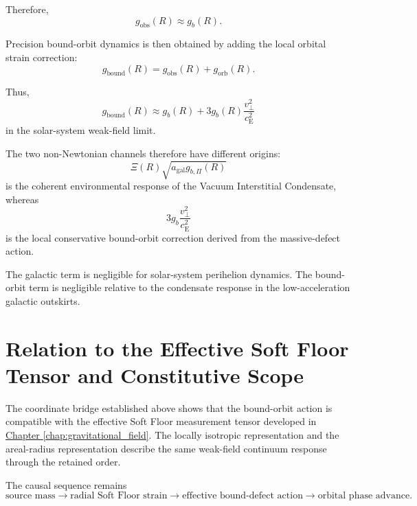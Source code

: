 Therefore,
\begin{equation}
    g_{\mathrm{obs}}(R) \approx g_b(R).
\end{equation}

Precision bound-orbit dynamics is then obtained by adding the local orbital strain correction:
\begin{equation}
    \boxed{ g_{\mathrm{bound}}(R) = g_{\mathrm{obs}}(R) + g_{\mathrm{orb}}(R) }.
\end{equation}

Thus,
\begin{equation}
    g_{\mathrm{bound}}(R) \approx g_b(R) + 3g_b(R) \frac{v_\perp^2}{c_{\mathrm{E}}^2}
\end{equation}
in the solar-system weak-field limit.

The two non-Newtonian channels therefore have different origins:
\begin{equation}
    \Xi(R) \sqrt{ a_{\mathrm{gal}}g_{b,\Pi}(R) }
\end{equation}
is the coherent environmental response of the Vacuum Interstitial Condensate, whereas
\begin{equation}
    3g_b \frac{v_\perp^2}{c_{\mathrm{E}}^2}
\end{equation}
is the local conservative bound-orbit correction derived from the massive-defect action.

The galactic term is negligible for solar-system perihelion dynamics. The bound-orbit term is negligible relative to the condensate response in the low-acceleration galactic outskirts.

\section{Relation to the Effective Soft Floor Tensor and Constitutive Scope}

The coordinate bridge established above shows that the bound-orbit action is compatible with the effective Soft Floor measurement tensor developed in \hyperref[chap:gravitational_field]{Chapter \ref*{chap:gravitational_field}}. The locally isotropic representation and the areal-radius representation describe the same weak-field continuum response through the retained order.

The causal sequence remains
\begin{equation}
    \text{source mass} \longrightarrow \text{radial Soft Floor strain} \longrightarrow \text{effective bound-defect action} \longrightarrow \text{orbital phase advance}.
\end{equation}

